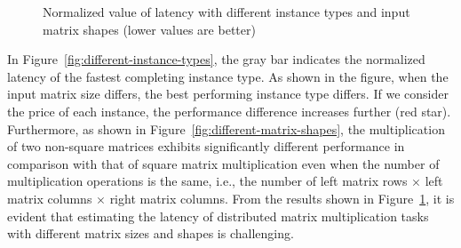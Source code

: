 \documentclass[10pt, conference, compsocconf]{IEEEtran}
\begin{document}
\begin{figure}[t]
  \centering
  \hfil\hfil\hfil\hfil\hfil\hfil\hfil\hfil\hfil\hfil{}
  \caption{\label{fig:instance-blocks-sizes-compare}Normalized value of latency with different instance types and input matrix shapes (lower values are better)}
\end{figure}

In Figure~\ref{fig:different-instance-types}, the gray bar indicates the normalized latency of the fastest completing instance type. As shown in the figure, when the input matrix size differs, the best performing instance type differs. If we consider the price of each instance, the performance difference increases further (red star). Furthermore, as shown in Figure~\ref{fig:different-matrix-shapes}, the multiplication of two non-square matrices exhibits significantly different performance in comparison with that of square matrix multiplication even when the number of multiplication operations is the same, i.e., the number of left matrix rows $\times$ left matrix columns $\times$ right matrix columns. From the results shown in Figure~\ref{fig:instance-blocks-sizes-compare}, it is evident that estimating the latency of distributed matrix multiplication tasks with different matrix sizes and shapes is challenging.
\end{document}
